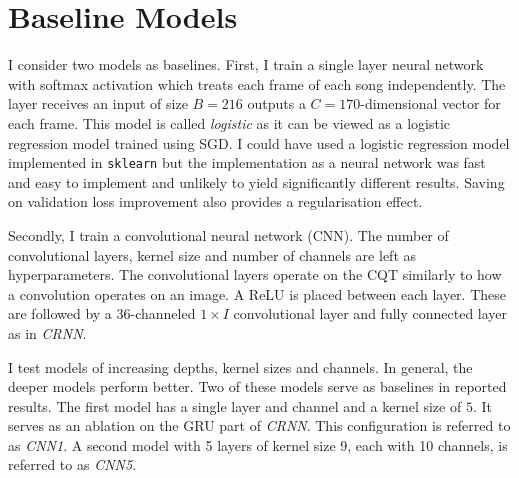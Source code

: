 \section{Baseline Models}\label{sec:baselines}

I consider two models as baselines. First, I train a single layer neural network with softmax activation which treats each frame of each song independently. The layer receives an input of size $B=216$ outputs a $C=170$-dimensional vector for each frame. This model is called \emph{logistic} as it can be viewed as a logistic regression model trained using SGD. I could have used a logistic regression model implemented in \texttt{sklearn} but the implementation as a neural network was fast and easy to implement and unlikely to yield significantly different results. Saving on validation loss improvement also provides a regularisation effect.

Secondly, I train a convolutional neural network (CNN). The number of convolutional layers, kernel size and number of channels are left as hyperparameters. The convolutional layers operate on the CQT similarly to how a convolution operates on an image. A ReLU is placed between each layer. These are followed by a 36-channeled $1\times I$ convolutional layer and fully connected layer as in \emph{CRNN}. 

I test models of increasing depths, kernel sizes and channels. In general, the deeper models perform better. Two of these models serve as baselines in reported results. The first model has a single layer and channel and a kernel size of $5$. It serves as an ablation on the GRU part of \emph{CRNN}. This configuration is referred to as \emph{CNN1}. A second model with 5 layers of kernel size 9, each with 10 channels, is referred to as \emph{CNN5}.

